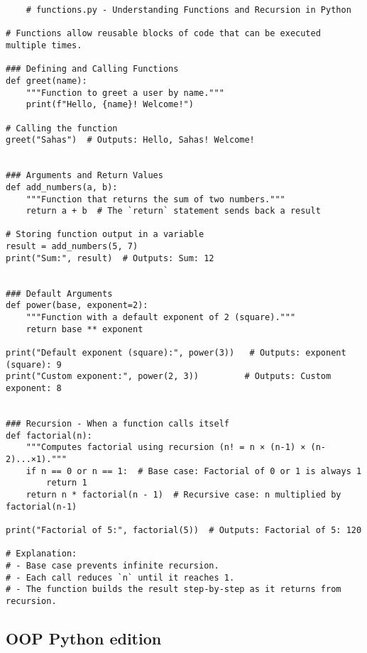 \begin{verbatim}
    # functions.py - Understanding Functions and Recursion in Python

# Functions allow reusable blocks of code that can be executed multiple times.

### Defining and Calling Functions
def greet(name):
    """Function to greet a user by name."""
    print(f"Hello, {name}! Welcome!")

# Calling the function
greet("Sahas")  # Outputs: Hello, Sahas! Welcome!


### Arguments and Return Values
def add_numbers(a, b):
    """Function that returns the sum of two numbers."""
    return a + b  # The `return` statement sends back a result

# Storing function output in a variable
result = add_numbers(5, 7)
print("Sum:", result)  # Outputs: Sum: 12


### Default Arguments
def power(base, exponent=2):
    """Function with a default exponent of 2 (square)."""
    return base ** exponent

print("Default exponent (square):", power(3))   # Outputs: exponent (square): 9
print("Custom exponent:", power(2, 3))         # Outputs: Custom exponent: 8


### Recursion - When a function calls itself
def factorial(n):
    """Computes factorial using recursion (n! = n × (n-1) × (n-2)...×1)."""
    if n == 0 or n == 1:  # Base case: Factorial of 0 or 1 is always 1
        return 1
    return n * factorial(n - 1)  # Recursive case: n multiplied by factorial(n-1)

print("Factorial of 5:", factorial(5))  # Outputs: Factorial of 5: 120

# Explanation:
# - Base case prevents infinite recursion.
# - Each call reduces `n` until it reaches 1.
# - The function builds the result step-by-step as it returns from recursion.
\end{verbatim}

\subsection{OOP Python edition}

